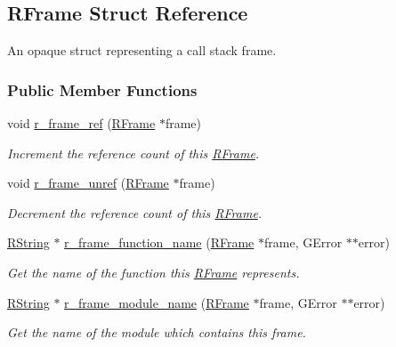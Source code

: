 \hypertarget{struct_r_frame}{\subsection{R\-Frame Struct Reference}
\label{struct_r_frame}
}


An opaque struct representing a call stack frame.  


\subsubsection*{Public Member Functions}
\begin{DoxyCompactItemize}
\item 
void \hyperlink{struct_r_frame_afe2c073f2e782ec284f7a5a390ab9725}{r\-\_\-frame\-\_\-ref} (\hyperlink{struct_r_frame}{R\-Frame} $\ast$frame)
\begin{DoxyCompactList}\small\item\em Increment the reference count of this \hyperlink{struct_r_frame}{R\-Frame}. \end{DoxyCompactList}\item 
void \hyperlink{struct_r_frame_a1326ea97655ac6fb1ad27b663dd6bba4}{r\-\_\-frame\-\_\-unref} (\hyperlink{struct_r_frame}{R\-Frame} $\ast$frame)
\begin{DoxyCompactList}\small\item\em Decrement the reference count of this \hyperlink{struct_r_frame}{R\-Frame}. \end{DoxyCompactList}\item 
\hyperlink{struct_r_string}{R\-String} $\ast$ \hyperlink{struct_r_frame_a1a8357f0188f0700229479fd10a5215e}{r\-\_\-frame\-\_\-function\-\_\-name} (\hyperlink{struct_r_frame}{R\-Frame} $\ast$frame, G\-Error $\ast$$\ast$error)
\begin{DoxyCompactList}\small\item\em Get the name of the function this \hyperlink{struct_r_frame}{R\-Frame} represents. \end{DoxyCompactList}\item 
\hyperlink{struct_r_string}{R\-String} $\ast$ \hyperlink{struct_r_frame_a15348a02f579ddd131d970875f91c521}{r\-\_\-frame\-\_\-module\-\_\-name} (\hyperlink{struct_r_frame}{R\-Frame} $\ast$frame, G\-Error $\ast$$\ast$error)
\begin{DoxyCompactList}\small\item\em Get the name of the module which contains this frame. \end{DoxyCompactList}\item 

\end{DoxyCompactItemize}
